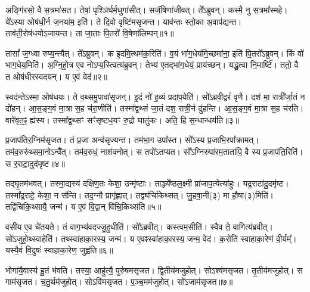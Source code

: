 \clearpage

\setcounter{anuvakam}{0}

अङ्गि॑रसो॒ वै स॒त्रमा॑सत।
तेषां॒ पृश्ञि॑र्घर्म॒धुगा॑सीत्।
सर्जी॒षेणा॑जीवत्।
ते᳚ऽब्रुवन्।
कस्मै॒ नु स॒त्रमा᳚स्महे।
ये᳚ऽस्या ओष॑धी॒र्न ज॒नया॑म॒ इति॑।
ते दि॒वो वृष्टि॑मसृजन्त।
याव॑न्तः स्तो॒का अ॒वाप॑द्यन्त।
ताव॑ती॒रोष॑धयो\-ऽजायन्त।
ता जा॒ताः पि॒तरो॑ वि॒षेणा॑लिम्पन्॥१॥

तासां᳚ ज॒ग्ध्वा रुप्य॒न्त्यैत्।
ते᳚ऽब्रुवन्।
क इ॒दमि॒त्थम॑क॒रिति॑।
व॒यं भा॑ग॒धेय॑मि॒च्छमा॑ना॒ इति॑ पि॒तरो᳚\-ऽब्रुवन्।
किं वो॑ भाग॒धेय॒मिति॑।
अ॒ग्नि॒हो॒त्र ए॒व नोऽप्य॒स्त्वित्य॑ब्रुवन्।
तेभ्य॑ ए॒तद्भा॑ग॒धेयं॒ प्राय॑च्छन्।
यद्धु॒त्वा नि॒मार्ष्टि॑।
ततो॒ वै त ओष॑धीरस्वदयन्।
य ए॒वं वेद॑॥२॥

स्वद॑न्ते\-ऽस्मा॒ ओष॑धयः।
ते व॒थ्समु॒पावा॑सृजन्।
इ॒दं नो॑ ह॒व्यं प्रदा॑प॒येति॑।
सो᳚ऽब्रवी॒द्वरं॑ वृणै।
दश॑ मा॒ रात्री᳚र्जा॒तं न दो॑हन्।
आ॒स॒ङ्ग॒वं मा॒त्रा स॒ह च॑रा॒णीति॑।
तस्मा᳚द्व॒थ्सं जा॒तं दश॒ रात्री॒र्न दु॑हन्ति।
आ॒स॒ङ्ग॒वं मा॒त्रा स॒ह च॑रति।
वारे॑वृत॒ꣴ॒ ह्य॑स्य।
तस्मा᳚द्व॒थ्सꣳ सꣳ॑सृष्टध॒यꣳ रु॒द्रो घातु॑कः।
अति॒ हि स॒न्धान्धय॑ति॥३॥\anuvakamend[अ॒लि॒म्प॒न्वेद॒ घातु॑क॒ एकं॑ च]

प्र॒जा\-प॑तिर॒ग्निम॑\-सृजत।
तं प्र॒जा अन्व॑सृज्यन्त।
तम॑भा॒ग उपा᳚स्त।
सो᳚ऽस्य प्र॒जाभि॒रपा᳚क्रामत्।
तम॑व॒रुरु॑थ्समा॒नो\-ऽन्वै᳚त्।
तम॑व॒रुधं॒ नाश॑क्नोत्।
स तपो॑\-ऽतप्यत।
सो᳚ऽग्निरुपा॑रम॒ताता॑पि॒ वै स्य प्र॒जा\-प॑ति॒रिति॑।
स र॒राटा॒दुद॑मृष्ट॥४॥

तद्\mbox{}घृ॒तम॑भवत्।
तस्मा॒द्यस्य॑ दक्षिण॒तः केशा॒ उन्मृ॑ष्टाः।
ताञ्ज्ये᳚ष्ठल॒क्ष्मी प्रा॑जाप॒त्येत्या॑हुः।
यद्र॒राटा॑दु॒दमृ॑ष्ट।
तस्मा᳚द्र॒राटे॒ केशा॒ न स॑न्ति।
तद॒ग्नौ प्रागृ॑ह्णात्।
तद्व्य॑चिकिथ्सत्।
जु॒हवा॒नी(३) मा हौ॒षा(३)मिति॑।
तद्वि॑चिकि॒थ्सायै॒ जन्म॑।
य ए॒वं वि॒द्वान् वि॑चि॒किथ्स॑ति॥५॥

वसी॑य ए॒व चे॑तयते।
तं वाग॒भ्य॑वदज्जु॒हुधीति॑।
सो᳚ऽब्रवीत्।
कस्त्वम॒सीति॑।
स्वैव ते॒ वागित्य॑ब्रवीत्।
सो॑ऽजुहो॒थ्स्वाहेति॑।
तथ्स्वा॑हाका॒रस्य॒ जन्म॑।
य ए॒वꣴस्वा॑हाका॒रस्य॒ जन्म॒ वेद॑।
क॒रोति॑ स्वाहाका॒रेण॑ वी॒र्यम्᳚।
यस्यै॒वं वि॒दुषः॑ स्वाहाका॒रेण॒ जुह्व॑ति॥६॥

भोगा॑यै॒वास्य॑ हु॒तं भ॑वति।
तस्या॒ आहु॑त्यै॒ पुरु॑षम\-सृजत।
द्वि॒तीय॑मजुहोत्।
सोऽश्व॑म\-सृजत।
तृ॒तीय॑मजुहोत्।
स गाम॑\-सृजत।
च॒तु॒र्थम॑जुहोत्।
सोऽवि॑म\-सृजत।
प॒ञ्च॒मम॑जुहोत्।
सो॑ऽजाम॑\-सृजत॥७॥

